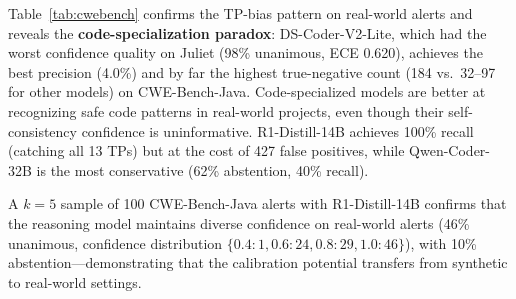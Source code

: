 \begin{table}[t]
\centering
\caption{CWE-Bench-Java results (549 CodeQL alerts, 45 projects, $k{=}1$). The 97\% FP base rate reflects the real-world triage challenge. DS-Coder-V2-Lite achieves the best precision and TN despite worst confidence quality (Table~\ref{tab:conformal_multimodel}), confirming the code-specialization paradox.}
\label{tab:cwebench}
\small
\setlength{\tabcolsep}{3.5pt}
\end{table}

Table~\ref{tab:cwebench} confirms the TP-bias pattern on real-world alerts and reveals the \textbf{code-specialization paradox}: DS-Coder-V2-Lite, which had the worst confidence quality on Juliet (98\% unanimous, ECE 0.620), achieves the best precision (4.0\%) and by far the highest true-negative count (184 vs.\ 32--97 for other models) on CWE-Bench-Java. Code-specialized models are better at recognizing safe code patterns in real-world projects, even though their self-consistency confidence is uninformative. R1-Distill-14B achieves 100\% recall (catching all 13 TPs) but at the cost of 427 false positives, while Qwen-Coder-32B is the most conservative (62\% abstention, 40\% recall).

A $k=5$ sample of 100 CWE-Bench-Java alerts with R1-Distill-14B confirms that the reasoning model maintains diverse confidence on real-world alerts (46\% unanimous, confidence distribution $\{0.4{:}1, 0.6{:}24, 0.8{:}29, 1.0{:}46\}$), with 10\% abstention---demonstrating that the calibration potential transfers from synthetic to real-world settings.

